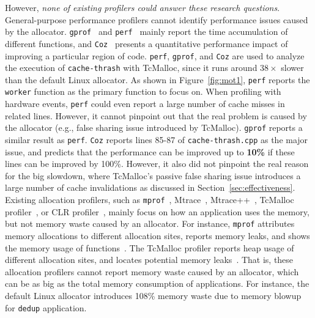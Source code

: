 However, \textit{none of existing profilers could answer these research questions}. General-purpose performance profilers cannot identify performance issues caused by the allocator. \texttt{gprof}~\cite{DBLP:conf/sigplan/GrahamKM82} and \texttt{perf}~\cite{perf} mainly report the time accumulation of different functions, and \texttt{Coz}~\cite{Coz} presents a quantitative performance impact of improving a particular region of code. \texttt{perf}, \texttt{gprof}, and \texttt{Coz} are used to analyze the execution of \texttt{cache-thrash} with TcMalloc, since it runs around $38\times$ slower than the default Linux allocator. As shown in Figure~\ref{fig:mot1}, \texttt{perf} reports the \texttt{worker} function as the primary function to focus on. When profiling with hardware events, \texttt{perf} could even report a large number of cache misses in related lines. However, it cannot pinpoint out that the real problem is caused by the  allocator (e.g., false sharing issue introduced by TcMalloc). \texttt{gprof} reports a similar result as \texttt{perf}. \texttt{Coz} reports lines 85-87 of \texttt{cache-thrash.cpp} as the major issue, and predicts that the performance can be improved up to \textbf{10\%} if these lines can be improved by 100\%. However, it 
also did not pinpoint the real reason for the big slowdown, where TcMalloc's passive false sharing issue introduces a large number of cache invalidations as discussed in Section~\ref{sec:effectiveness}. Existing allocation profilers, such as \texttt{mprof}~\cite{Zorn:1988:MAP:894814}, Mtrace~\cite{mtrace}, Mtrace++~\cite{Lee:2000:DMM:786772.787150}, TcMalloc profiler~\cite{tcmalloc-profiler}, or CLR profiler~\cite{lupasc2014dynamic}, mainly focus on how an application uses the memory, but not memory waste caused by an allocator. For instance, \texttt{mprof} attributes memory allocations to different allocation sites, reports memory leaks, and shows the memory usage of functions~\cite{Zorn:1988:MAP:894814}. The TcMalloc profiler reports heap usage of different allocation sites, and locates potential memory leaks~\cite{tcmalloc-profiler}. That is, these allocation profilers cannot report memory waste caused by an allocator, which can be as big as the total memory consumption of applications. For instance, the default Linux allocator introduces 108\% memory waste due to memory blowup for \texttt{dedup} application.

